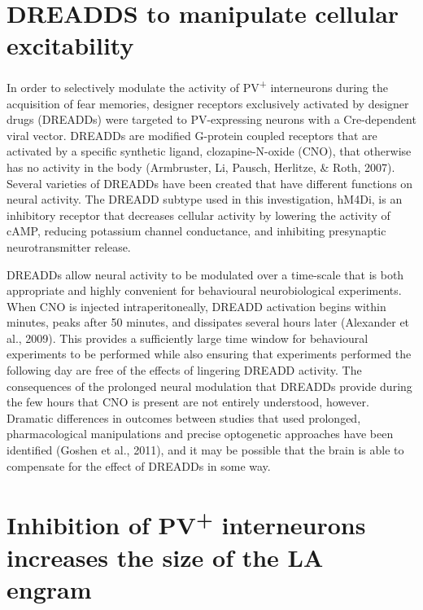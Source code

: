 \documentclass[12pt,a4paperpaper,]{report}
\begin{document}
\section{DREADDS to manipulate cellular
excitability}\label{dreadds-to-manipulate-cellular-excitability}

In order to selectively modulate the activity of PV\textsuperscript{+}
interneurons during the acquisition of fear memories, designer receptors
exclusively activated by designer drugs (DREADDs) were targeted to
PV-expressing neurons with a Cre-dependent viral vector. DREADDs are
modified G-protein coupled receptors that are activated by a specific
synthetic ligand, clozapine-N-oxide (CNO), that otherwise has no
activity in the body (Armbruster, Li, Pausch, Herlitze, \& Roth, 2007).
Several varieties of DREADDs have been created that have different
functions on neural activity. The DREADD subtype used in this
investigation, hM4Di, is an inhibitory receptor that decreases cellular
activity by lowering the activity of cAMP, reducing potassium channel
conductance, and inhibiting presynaptic neurotransmitter release.

DREADDs allow neural activity to be modulated over a time-scale that is
both appropriate and highly convenient for behavioural neurobiological
experiments. When CNO is injected intraperitoneally, DREADD activation
begins within minutes, peaks after 50 minutes, and dissipates several
hours later (Alexander et al., 2009). This provides a sufficiently large
time window for behavioural experiments to be performed while also
ensuring that experiments performed the following day are free of the
effects of lingering DREADD activity. The consequences of the prolonged
neural modulation that DREADDs provide during the few hours that CNO is
present are not entirely understood, however. Dramatic differences in
outcomes between studies that used prolonged, pharmacological
manipulations and precise optogenetic approaches have been identified
(Goshen et al., 2011), and it may be possible that the brain is able to
compensate for the effect of DREADDs in some way.

\section{\texorpdfstring{Inhibition of PV\textsuperscript{+}
interneurons increases the size of the LA
engram}{Inhibition of PV+ interneurons increases the size of the LA engram}}\label{inhibition-of-pv-interneurons-increases-the-size-of-the-la-engram}
\end{document}
